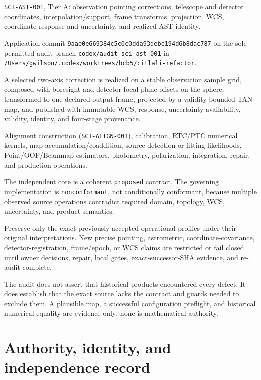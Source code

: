 \documentclass[11pt]{article}
\newcommand{\pkg}{\texttt{SCI-AST-001}}
\newcommand{\code}[1]{\nolinkurl{#1}}
\newcommand{\status}[1]{\nolinkurl{#1}}
\begin{document}
\begin{description}[style=nextline]
\item[Package] \pkg, Tier A: observation pointing corrections, telescope and
detector coordinates, interpolation/support, frame transforms, projection,
WCS, coordinate response and uncertainty, and realized AST identity.
\item[Exact implementation] Application commit
\code{9aae0e669384c5c0c0dda93debc194d6b8dac787} on the sole permitted audit
branch \code{codex/audit-sci-ast-001} in
\code{/Users/gwilson/.codex/worktrees/bcb5/citlali-refactor}.
\item[Claimed estimator] A selected two-axis correction is realized on a
stable observation sample grid, composed with boresight and detector focal-plane
offsets on the sphere, transformed to one declared output frame, projected by
a validity-bounded TAN map, and published with immutable WCS, response,
uncertainty availability, validity, identity, and four-stage provenance.
\item[Explicit exclusions] Alignment construction (\code{SCI-ALIGN-001}),
calibration, RTC/PTC numerical kernels, map accumulation/coaddition, source
detection or fitting likelihoods, Point/OOF/Beammap estimators, photometry,
polarization, integration, repair, and production operations.
\item[Strongest conclusion] The independent core is a coherent
\status{proposed} contract.  The governing implementation is
\status{nonconformant}, not conditionally conformant, because multiple observed
source operations contradict required domain, topology, WCS, uncertainty, and
product semantics.
\item[Consumer policy] Preserve only the exact previously accepted operational
profiles under their original interpretations.  New precise pointing,
astrometric, coordinate-covariance, detector-registration, frame/epoch, or WCS
claims are restricted or fail closed until owner decisions, repair, local
gates, exact-successor-SHA evidence, and re-audit complete.
\end{description}

The audit does not assert that historical products encountered every defect.
It does establish that the exact source lacks the contract and guards needed to
exclude them. A plausible map, a successful configuration preflight, and
historical numerical equality are evidence only; none is mathematical authority.

\section{Authority, identity, and independence record}
\end{document}
